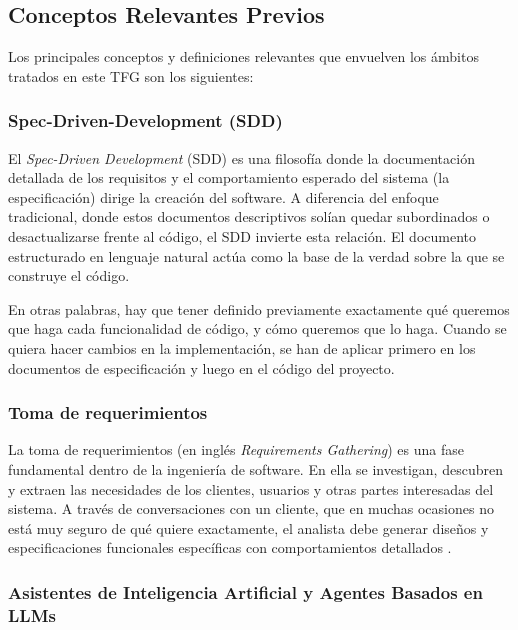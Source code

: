 \documentclass[11pt, letterpaper]{article}
\begin{document}
\subsection{Conceptos Relevantes Previos}
\label{sec:conceptos_relevantes}
Los principales conceptos y definiciones relevantes que envuelven los ámbitos tratados en este TFG son los siguientes:

\subsubsection{Spec-Driven-Development (SDD)}
\label{sec:sdd}

El \textit{Spec-Driven Development} (SDD) es una filosofía donde la documentación detallada de los requisitos y el comportamiento esperado del sistema (la especificación) dirige la creación del software. A diferencia del enfoque tradicional, donde estos documentos descriptivos solían quedar subordinados o desactualizarse frente al código, el SDD invierte esta relación. El documento estructurado en lenguaje natural actúa como la base de la verdad sobre la que se construye el código. \cite{ostroff_agile_2004} \cite{github_spec_kit}

En otras palabras, hay que tener definido previamente exactamente qué queremos que haga cada funcionalidad de código, y cómo queremos que lo haga. Cuando se quiera hacer cambios en la implementación, se han de aplicar primero en los documentos de especificación y luego en el código del proyecto. \\

\subsubsection{Toma de requerimientos}
\label{sec:toma_requerimientos}

La toma de requerimientos (en inglés \textit{Requirements Gathering}) es una fase fundamental dentro de la ingeniería de software. En ella se investigan, descubren y extraen las necesidades de los clientes, usuarios y otras partes interesadas del sistema. A través de conversaciones con un cliente, que en muchas ocasiones no está muy seguro de qué quiere exactamente, el analista debe generar diseños y especificaciones funcionales específicas con comportamientos detallados \cite{jama_requirements} \cite{sommerville_se_2015}.

\subsubsection{Asistentes de Inteligencia Artificial y Agentes Basados en LLMs}
\label{sec:asistentes_ia}
\end{document}
